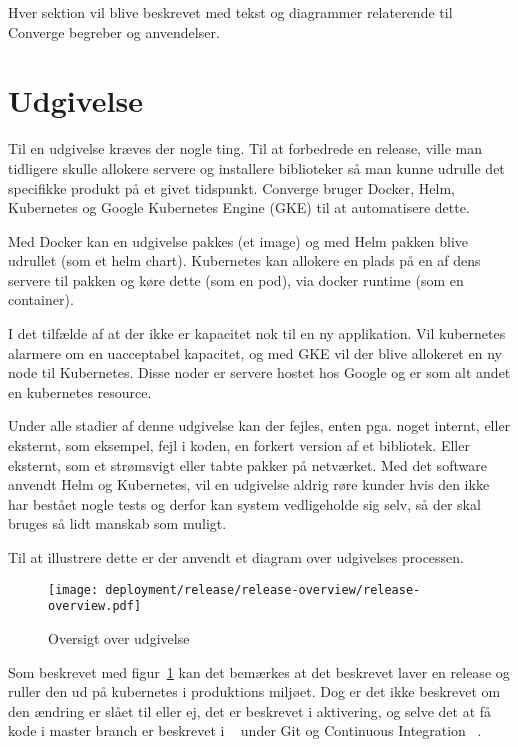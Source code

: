 Hver sektion vil blive beskrevet med tekst og diagrammer relaterende til Converge begreber og anvendelser.

\section{Udgivelse}

Til en udgivelse kræves der nogle ting. Til at forbedrede en release, ville man tidligere skulle allokere servere og installere biblioteker så man kunne udrulle det specifikke produkt på et givet tidspunkt. Converge bruger Docker, Helm, Kubernetes og Google Kubernetes Engine (GKE) til at automatisere dette.

Med Docker kan en udgivelse pakkes (et image) og med Helm pakken blive udrullet (som et helm chart). Kubernetes kan allokere en plads på en af dens servere til pakken og køre dette (som en pod), via docker runtime (som en container).

I det tilfælde af at der ikke er kapacitet nok til en ny applikation. Vil kubernetes alarmere om en uacceptabel kapacitet, og med GKE vil der blive allokeret en ny node til Kubernetes. Disse noder er servere hostet hos Google og er som alt andet en kubernetes resource.

Under alle stadier af denne udgivelse kan der fejles, enten pga. noget internt, eller eksternt, som eksempel, fejl i koden, en forkert version af et bibliotek. Eller eksternt, som et strømsvigt eller tabte pakker på netværket. Med det software anvendt Helm og Kubernetes, vil en udgivelse aldrig røre kunder hvis den ikke har bestået nogle tests og derfor kan system vedligeholde sig selv, så der skal bruges så lidt manskab som muligt.

Til at illustrere dette er der anvendt et diagram over udgivelses processen.

\begin{figure}[H]
    \begin{small}
        \begin{center}
            \texttt{[image: deployment/release/release-overview/release-overview.pdf]}
        \end{center}
        \caption{Oversigt over udgivelse}
        \label{fig:release-overview}
    \end{small}
\end{figure}

Som beskrevet med figur~\ref{fig:release-overview} kan det bemærkes at det beskrevet laver en release og ruller den ud på kubernetes i produktions miljøet. Dog er det ikke beskrevet om den ændring er slået til eller ej, det er beskrevet i aktivering, og selve det at få kode i master branch er beskrevet i ~\cite{documentation_development}  under Git og Continuous Integration ~\cite{documentation_terms}.

